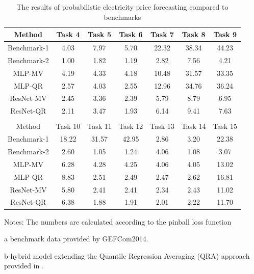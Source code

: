 \documentclass[review]{elsarticle}
\begin{document}
    \begin{table}[H]
      \caption{The results of probabilistic electricity price forecasting compared to benchmarks}
      \begin{adjustbox}{width=\textwidth}
      \begin{threeparttable}
        \begin{center}
          \begin{tabular}{ccccccc}
            \hline
            Method & Task 4 & Task 5& Task 6 & Task 7& Task 8 & Task 9\\
            \hline
            Benchmark-1 \tnote{a} & 4.03 & 7.97 & 5.70 & 22.32 & 38.34 & 44.23 \\
            Benchmark-2 \tnote{b} & 1.00 & 1.82 & 1.19 & 2.82 & 7.56 & 4.21 \\
            \hline
            MLP-MV & 4.19 & 4.33 & 4.18 & 10.48 & 31.57 & 33.35 \\
            MLP-QR & 2.57 & 4.03 & 2.55 & 12.96 & 34.76 & 36.24 \\
            ResNet-MV& 2.45 & 3.36 & 2.39 & 5.79 & 8.79 & 6.95 \\
            ResNet-QR& 2.11& 3.47& 1.93 & 6.14 & 9.41 & 7.63 \\
            \hline
            \\
            \hline
            Method & Task 10 & Task 11& Task 12 & Task 13 & Task 14 & Task 15\\
            \hline
            Benchmark-1 \tnote{a} &  18.22 & 31.57 & 42.95 & 2.86 & 3.20 & 22.38\\
            Benchmark-2 \tnote{b} &  2.60 & 1.05 & 1.24 & 4.06 & 1.08 & 3.07 \\
            \hline
            MLP-MV &  6.28 & 4.28 & 4.25 & 4.06 & 4.05 & 13.02\\
            MLP-QR &  8.83 & 2.51 & 2.49 & 2.47 & 2.62 & 16.81\\
            ResNet-MV & 5.80 & 2.41 & 2.41 & 2.34 & 2.43 & 11.02 \\
            ResNet-QR & 6.38 & 1.88 & 1.91 & 2.01 & 2.22 &11.70 \\
            \hline
          \end{tabular}
            \begin{tablenotes}
              Notes: The numbers are calculated according to the pinball loss function
              \item[a] benchmark data provided by GEFCom2014.
              \item[b] hybrid model extending the Quantile Regression Averaging (QRA) approach provided in \cite{Maciejowska2016}.
            \end{tablenotes}
        \end{center}
      \end{threeparttable}
      \end{adjustbox}
      \label{table:result_pinball}
    \end{table}
\end{document}
